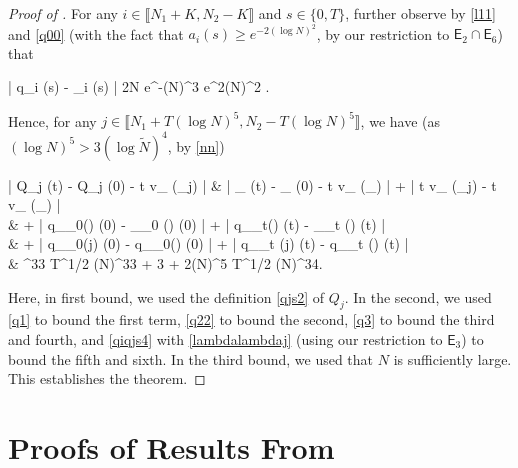 \documentclass{amsart}
\numberwithin{equation}{section}
\DeclareMathOperator{\eff}{eff}
\theoremstyle{remark}
\theoremstyle{definition}
\begin{document}
\begin{proof}[Proof of ]
		\noindent For any $i \in \llbracket N_1+K,N_2-K \rrbracket$ and $s \in \{ 0, T \}$, further observe by \eqref{l11} and \eqref{q00} (with the fact that $a_i (s) \ge e^{-2(\log N)^2}$, by our restriction to $\mathsf{E}_2 \cap \mathsf{E}_6$) that
		\begin{flalign}
			\label{q3} 
			| q_i (s) - _i (s) | \le 2N \cdot e^{-(\log N)^3}   e^{2(\log N)^2} .
		\end{flalign} 
		
		\noindent Hence, for any $j \in \llbracket N_1 + T(\log N)^5, N_2 - T(\log N)^5 \rrbracket$, we have (as $(\log N)^5 > 3 (\log \tilde{N})^4$, by \eqref{nn})  
		\begin{flalign*}
			\big| Q_j (t) - Q_j (0) - t v_{\eff} (\lambda_j) \big| & \le \big| _{} (t) - _{} (0) - t v_{\eff} (\tilde{\lambda}_{}) \big| + | t v_{\eff} (\lambda_j) - t v_{\eff} (\tilde{\lambda}_{}) | \\
				& \qquad + | q_{\tilde{\varphi}_0()} (0) - _{\tilde{\varphi}_0 ()} (0) | + | q_{\tilde{\varphi}_t()} (t) - _{\tilde{\varphi}_t ()} (t) | \\
				& \qquad + | q_{\varphi_0(j)} (0) - q_{\tilde{\varphi}_0()} (0) | + | q_{\varphi_t (j)} (t) - q_{\tilde{\varphi}_t ()} (t) | \\
				& ^{33} \cdot T^{1/2} (\log N)^{33} + 3 + 2(\log N)^5 \le T^{1/2} (\log N)^{34}.
		\end{flalign*}
		
		\noindent Here, in first bound, we used the definition \eqref{qjs2} of $Q_j$. In the second, we used \eqref{q1} to bound the first term, \eqref{q22} to bound the second, \eqref{q3} to bound the third and fourth, and \eqref{qiqjs4} with \eqref{lambdalambdaj} (using our restriction to $\mathsf{E}_3$) to bound the fifth and sixth. In the third bound, we used that $N$ is sufficiently large. This establishes the theorem.
	\end{proof}
	
	\appendix
	
	
	
	
	
	\section{Proofs of Results From }
	
	\label{ProofT}
	
\end{document}
